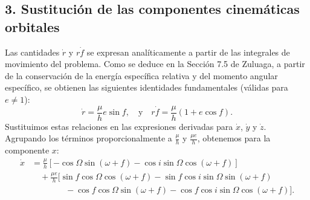 \documentclass[12pt, a4paper]{article}
\begin{document}
\subsection*{3. Sustitución de las componentes cinemáticas orbitales}
Las cantidades $\dot{r}$ y $r\dot{f}$ se expresan analíticamente a partir de las integrales de movimiento del problema. Como se deduce en la Sección 7.5 de Zuluaga, a partir de la conservación de la energía específica relativa y del momento angular específico, se obtienen las siguientes identidades fundamentales (válidas para $e \neq 1$):
\begin{equation}
\dot{r} = \frac{\mu}{h} e \sin f, \quad \text{y} \quad r\dot{f} = \frac{\mu}{h} (1 + e \cos f).
\end{equation}
Sustituimos estas relaciones en las expresiones derivadas para $\dot{x}$, $\dot{y}$ y $\dot{z}$. Agrupando los términos proporcionalmente a $\frac{\mu}{h}$ y $\frac{\mu e}{h}$, obtenemos para la componente $x$:
\begin{align*}
\dot{x} &= \frac{\mu}{h} \left[ -\cos\Omega \sin(\omega+f) - \cos i \sin\Omega \cos(\omega+f) \right] \\
&\quad + \frac{\mu e}{h} \Big[ \sin f \cos\Omega \cos(\omega+f) - \sin f \cos i \sin\Omega \sin(\omega+f) \\
&\quad\quad\quad\quad - \cos f \cos\Omega \sin(\omega+f) - \cos f \cos i \sin\Omega \cos(\omega+f) \Big].
\end{align*}
\end{document}
